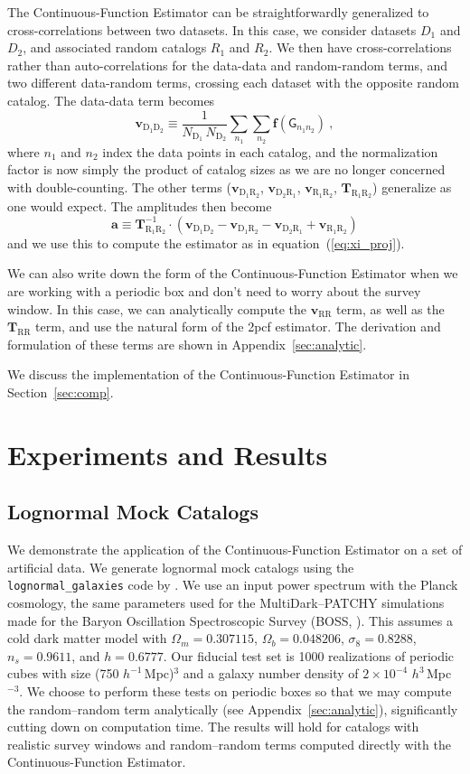 \documentclass[modern]{aastex62}
\newcommand{\cf}{2pcf\xspace}
\newcommand{\Est}{The Continuous-Function Estimator\xspace}
\newcommand{\est}{the Continuous-Function Estimator\xspace}
\newcommand{\eqt}[1]{equation~(\ref{#1})}
\newcommand{\inv}{^{-1}}
\newcommand{\hmpc}{$h^{-1}\,$Mpc}
\newcommand{\bld}[1]{\bm{#1}}
\newcommand{\vv}[1]{\bld{v}_\mathrm{#1}}
\newcommand{\TT}[1]{\bld{T}_\mathrm{#1}}
\newcommand{\ff}{\bld{f}}
\newcommand{\NN}[1]{N_\mathrm{#1}}
\newcommand{\GG}[1]{\mathsf{G}_{#1}}
\begin{document}
\Est can be straightforwardly generalized to cross-correlations between two datasets.
In this case, we consider datasets $D_1$ and $D_2$, and associated random catalogs $R_1$ and $R_2$. 
We then have cross-correlations rather than auto-correlations for the data-data and random-random terms, and two different data-random terms, crossing each dataset with the opposite random catalog. 
The data-data term becomes 
\begin{equation}
    \vv{D_1 D_2} \equiv \frac{1}{\NN{D_1}\,\NN{D_2}} \sum_{n_1} \sum_{n_2} \ff(\GG{n_1 n_2}) ~,
\end{equation}
where $n_1$ and $n_2$ index the data points in each catalog, and the normalization factor is now simply the product of catalog sizes as we are no longer concerned with double-counting.
The other terms ($\vv{D_1 R_2}$, $\vv{D_2 R_1}$, $\vv{R_1 R_2}$, $\TT{R_1 R_2}$) generalize as one would expect.
The amplitudes then become
\begin{equation}\displaystyle
    \bld{a} \equiv \TT{R_1 R_2}\inv \cdot (\vv{D_1 D_2} - \vv{D_1 R_2} - \vv{D_2 R_1} + \vv{R_1 R_2})
 \end{equation}
and we use this to compute the estimator as in \eqt{eq:xi_proj}.

We can also write down the form of \est when we are working with a periodic box and don't need to worry about the survey window.
In this case, we can analytically compute the $\vv{RR}$ term, as well as the $\TT{RR}$ term, and use the natural form of the \cf estimator.
The derivation and formulation of these terms are shown in Appendix~\ref{sec:analytic}.

We discuss the implementation of \est in Section~\ref{sec:comp}.


\section{Experiments and Results}
\label{sec:experiments}

\subsection{Lognormal Mock Catalogs}

We demonstrate the application of \est on a set of artificial data.
We generate lognormal mock catalogs \citep{ColesJones1991} using the \texttt{lognormal\_galaxies} code by \citep{Agrawal2017}.
We use an input power spectrum with the Planck cosmology, the same parameters used for the MultiDark--PATCHY simulations \citep{Kitaura2016} made for the Baryon Oscillation Spectroscopic Survey (BOSS, \citealt{Dawson2013}).
This assumes a cold dark matter model with $\Omega_m = 0.307115$, $\Omega_b = 0.048206$, $\sigma_8 = 0.8288$, $n_s = 0.9611$, and $h = 0.6777$.
Our fiducial test set is 1000 realizations of periodic cubes with size (750 \hmpc)$^3$ and a galaxy number density of $2 \times 10^{-4}$ $h^{3}\,$Mpc$^{-3}$.
We choose to perform these tests on periodic boxes so that we may compute the random--random term analytically (see Appendix~\ref{sec:analytic}), significantly cutting down on computation time.
The results will hold for catalogs with realistic survey windows and random--random terms computed directly with \est.
\end{document}
